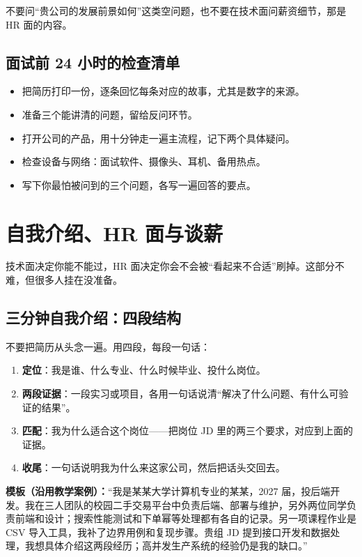\documentclass[UTF8,zihao=5,openany]{ctexbook}
\begin{document}
不要问“贵公司的发展前景如何”这类空问题，也不要在技术面问薪资细节，那是 HR 面的内容。

\subsection{面试前 24 小时的检查清单}
\begin{itemize}
\item 把简历打印一份，逐条回忆每条对应的故事，尤其是数字的来源。
\item 准备三个能讲清的问题，留给反问环节。
\item 打开公司的产品，用十分钟走一遍主流程，记下两个具体疑问。
\item 检查设备与网络：面试软件、摄像头、耳机、备用热点。
\item 写下你最怕被问到的三个问题，各写一遍回答的要点。
\end{itemize}


\section{自我介绍、HR 面与谈薪}

技术面决定你能不能过，HR 面决定你会不会被“看起来不合适”刷掉。这部分不难，但很多人挂在没准备。

\subsection{三分钟自我介绍：四段结构}

不要把简历从头念一遍。用四段，每段一句话：
\begin{enumerate}
\item \textbf{定位}：我是谁、什么专业、什么时候毕业、投什么岗位。
\item \textbf{两段证据}：一段实习或项目，各用一句话说清“解决了什么问题、有什么可验证的结果”。
\item \textbf{匹配}：我为什么适合这个岗位——把岗位 JD 里的两三个要求，对应到上面的证据。
\item \textbf{收尾}：一句话说明我为什么来这家公司，然后把话头交回去。
\end{enumerate}

\begin{casebox}
\textbf{模板（沿用教学案例）：}“我是某某大学计算机专业的某某，2027 届，投后端开发。我在三人团队的校园二手交易平台中负责后端、部署与维护，另外两位同学负责前端和设计；搜索性能测试和下单幂等处理都有各自的记录。另一项课程作业是 CSV 导入工具，我补了边界用例和复现步骤。贵组 JD 提到接口开发和数据处理，我想具体介绍这两段经历；高并发生产系统的经验仍是我的缺口。”
\end{casebox}
\end{document}
